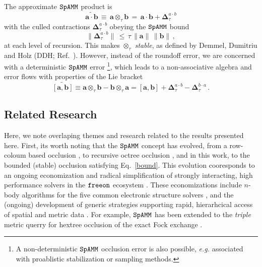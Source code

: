 \documentclass[letterpaper,twocolumn,amsmath,amsfont,amssymb,english,aps,jcp,preprintnumbers,groupaddress,nofootinbib,tightenlines]{revtex4}
\newcommand{\mat}[1]{\boldsymbol{#1}}
\newcommand{\ot}{ {\scriptstyle \otimes}_{ \tau } }
\begin{document}
The approximate $\tt SpAMM$ product is 
\begin{equation}
\widetilde{\mat{a}\cdot \mat{b}} \,  \equiv \, \mat{a} \ot \mat{b} \, 
  = \, \mat{a} \cdot \mat{b} + \mat{\Delta}^{a \cdot b}_{\tau} 
\end{equation}
with the culled contractions $\mat{\Delta}^{a \cdot b}_{\tau}$ obeying the $\tt SpAMM$ bound 
\begin{equation}\label{bound}
\lVert \mat{\Delta}^{a \cdot b}_{\tau} \rVert \, \leq \, \tau \, \lVert \mat{a} \rVert  \,  \lVert \mat{b} \rVert \, , 
\end{equation}
at each level of recursion.  This makes $\ot$ {\em stable}, as defined by Demmel, Dumitriu and Holz (DDH; Ref.~\cite{Demmel07}). 
However, instead of the roundoff error, we are concerned with a deterministic $\tt SpAMM$ error \footnote{A non-deterministic
${\tt SpAMM}$ occlusion error is also possible, {\em e.g.} associated with proablistic stabilization\cite{} or sampling\cite{} methods.},  which 
leads to a non-associative algebra and error flows with properties of the Lie bracket
\begin{equation} \label{braket}
\widetilde{\left[ \mat{a} , \mat{b} \right]} \equiv \mat{a} \ot \mat{b}-\mat{b} \ot \mat{a}  
=  \left[ \mat{a} , \mat{b} \right]
+ \mat{\Delta}^{a\cdot b}_{\tau} -\mat{\Delta}^{b\cdot a}_{\tau} \,.
\end{equation}

\subsection{Related Research} 

Here, we note overlaping themes and research related to the results presented here.
First,  its worth noting that the $\tt SpAMM$ concept has evolved, 
from a row-coloum based occlusion \cite{}, to recursive octree occlusion \cite{}, and in this work, to the
bounded (stable) occlusion satisfying Eq.~\ref{bound}.    This evolution cooresponds to an  ongoing economization and radical simplification
of strongly interacting,  high performance solvers in the $\tt freeon$ ecosystem \cite{}.  These economizations 
include $n$-body algorithms for the five common electronic structure solvers \cite{}, 
and the (ongoing) development of generic strategies supporting rapid, hierarhcical access of spatial and metric data \cite{sammet, wise}.  
For example, $\tt SpAMM$ has been extended to the {\em triple} metric querry for hextree occlusion of 
the exact Fock exchange \cite{}.  
\end{document}
